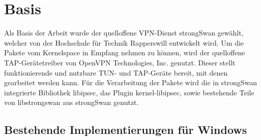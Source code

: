 


\section{Basis}
Als Basis der Arbeit wurde der quelloffene VPN-Dienst strongSwan gewählt,
welcher von der Hochschule für Technik Rapperswill entwickelt wird.
Um die Pakete vom Kernelspace in Empfang nehmen zu können, wird der quelloffene
TAP-Gerätetreiber von OpenVPN Technologies, Inc. genutzt. Dieser stellt funktionierende
und nutzbare TUN- und TAP-Geräte bereit, mit denen gearbeitet werden kann.
Für die Verarbeitung der Pakete wird die in strongSwan integrierte Bibliothek libipsec,
das Plugin kernel-libipsec, sowie bestehende Teile von libstrongswan
aus strongSwan genutzt.

\subsection{Bestehende Implementierungen für Windows}


